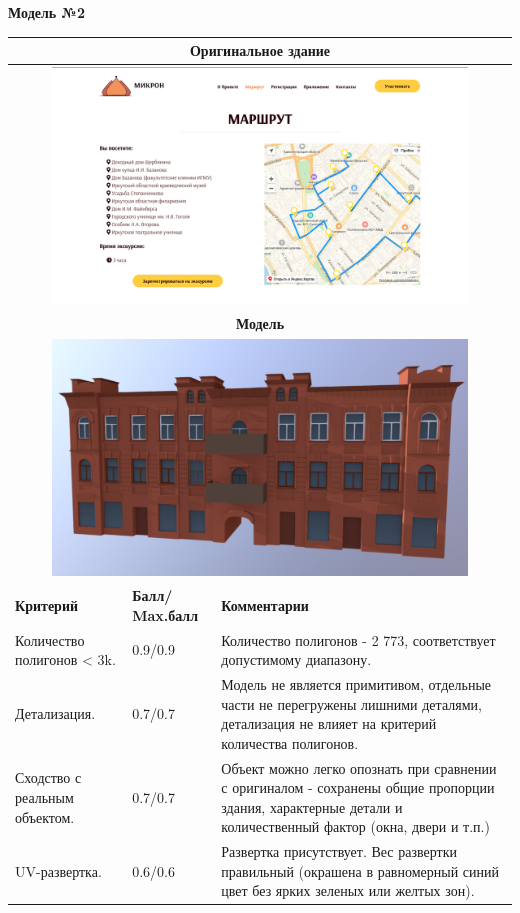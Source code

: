 \begin{center}
    \textbf{Модель №2}
\end{center}

\begin{longtable}{|p{4cm}|p{2.5cm}|p{7.5cm}|}
    \hline
    \multicolumn{3}{|c|}{\textbf{Оригинальное здание} } \\
    \hline
    \multicolumn{3}{|c|}{\includegraphics[width=11cm]{3}} \\
    \hline
    \multicolumn{3}{|c|}{\textbf{Модель}} \\
    \hline
    \multicolumn{3}{|c|}{\includegraphics[width=11cm]{src/model_2}} \\
    \hline
    \textbf{Критерий} & \textbf{Балл/ Max.балл} & \textbf{Комментарии} \\
    \hline
    Количество полигонов < 3k.& 0.9/0.9 & Количество полигонов - 2 773, соответствует допустимому диапазону.\\
    \hline 
    Детализация. & 0.7/0.7 & Модель не является примитивом, отдельные части не перегружены лишними деталями, детализация не влияет на критерий количества полигонов. \\
    \hline
    Сходство с реальным объектом. & 0.7/0.7 & Объект можно легко опознать при сравнении с оригиналом - сохранены общие пропорции здания, характерные детали и количественный фактор (окна, двери и т.п.) \\
    \hline
    UV-развертка. & 0.6/0.6 & Развертка присутствует. Вес развертки правильный (окрашена в равномерный синий цвет без ярких зеленых или желтых зон). 
    

\end{longtable}
